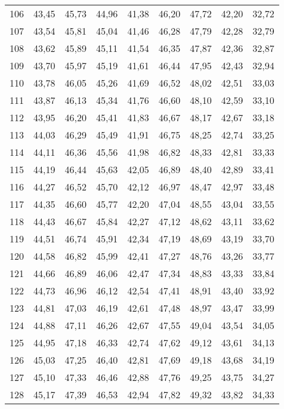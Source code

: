 \begin{longtable}{c c c c c c c c c}
      106	& 43,45	& 45,73	& 44,96	& 41,38	& 46,20	& 47,72	& 42,20	& 32,72 \\
      107	& 43,54	& 45,81	& 45,04	& 41,46	& 46,28	& 47,79	& 42,28	& 32,79 \\
      108	& 43,62	& 45,89	& 45,11	& 41,54	& 46,35	& 47,87	& 42,36	& 32,87 \\
      109	& 43,70	& 45,97	& 45,19	& 41,61	& 46,44	& 47,95	& 42,43	& 32,94 \\
      110	& 43,78	& 46,05	& 45,26	& 41,69	& 46,52	& 48,02	& 42,51	& 33,03 \\
      111	& 43,87	& 46,13	& 45,34	& 41,76	& 46,60	& 48,10	& 42,59	& 33,10 \\
      112	& 43,95	& 46,20	& 45,41	& 41,83	& 46,67	& 48,17	& 42,67	& 33,18 \\
      113	& 44,03	& 46,29	& 45,49	& 41,91	& 46,75	& 48,25	& 42,74	& 33,25 \\
      114	& 44,11	& 46,36	& 45,56	& 41,98	& 46,82	& 48,33	& 42,81	& 33,33 \\
      115	& 44,19	& 46,44	& 45,63	& 42,05	& 46,89	& 48,40	& 42,89	& 33,41 \\
      116	& 44,27	& 46,52	& 45,70	& 42,12	& 46,97	& 48,47	& 42,97	& 33,48 \\
      117	& 44,35	& 46,60	& 45,77	& 42,20	& 47,04	& 48,55	& 43,04	& 33,55 \\
      118	& 44,43	& 46,67	& 45,84	& 42,27	& 47,12	& 48,62	& 43,11	& 33,62 \\
      119	& 44,51	& 46,74	& 45,91	& 42,34	& 47,19	& 48,69	& 43,19	& 33,70 \\
      120	& 44,58	& 46,82	& 45,99	& 42,41	& 47,27	& 48,76	& 43,26	& 33,77 \\
      121	& 44,66	& 46,89	& 46,06	& 42,47	& 47,34	& 48,83	& 43,33	& 33,84 \\
      122	& 44,73	& 46,96	& 46,12	& 42,54	& 47,41	& 48,91	& 43,40	& 33,92 \\
      123	& 44,81	& 47,03	& 46,19	& 42,61	& 47,48	& 48,97	& 43,47	& 33,99 \\
      124	& 44,88	& 47,11	& 46,26	& 42,67	& 47,55	& 49,04	& 43,54	& 34,05 \\
      125	& 44,95	& 47,18	& 46,33	& 42,74	& 47,62	& 49,12	& 43,61	& 34,13 \\
      126	& 45,03	& 47,25	& 46,40	& 42,81	& 47,69	& 49,18	& 43,68	& 34,19 \\
      127	& 45,10	& 47,33	& 46,46	& 42,88	& 47,76	& 49,25	& 43,75	& 34,27 \\
      128	& 45,17	& 47,39	& 46,53	& 42,94	& 47,82	& 49,32	& 43,82	& 34,33 \\

\end{longtable}
